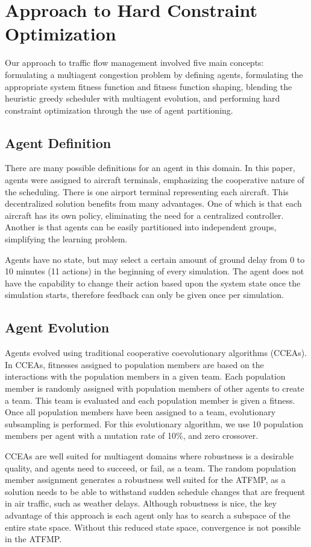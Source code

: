 \documentclass{sig-alternate}
\begin{document}
\section{Approach to Hard Constraint Optimization}

Our approach to traffic flow management involved five main concepts: formulating a multiagent congestion problem by defining agents, formulating the appropriate system fitness function and fitness function shaping, blending the heuristic greedy scheduler with multiagent evolution, and performing hard constraint optimization through the use of agent partitioning.

\subsection{Agent Definition}
There are many possible definitions for an agent in this domain. In this paper, agents were assigned to aircraft terminals, emphasizing the cooperative nature of the scheduling. There is one airport terminal representing each aircraft. This decentralized solution benefits from many advantages. One of which is that each aircraft has its own policy, eliminating the need for a centralized controller. Another is that agents can be easily partitioned into independent groups, simplifying the learning problem.  

Agents have no state, but may select a certain amount of ground delay from 0 to 10 minutes (11 actions) in the beginning of every simulation. The agent does not have the capability to change their action based upon the system state once the simulation starts, therefore feedback can only be given once per simulation.

\subsection{Agent Evolution}
Agents evolved using traditional cooperative coevolutionary algorithms (CCEAs). In CCEAs, fitnesses assigned to population members are based on the interactions with the population members in a given team. Each population member is randomly assigned with population members of other agents to create a team. This team is evaluated and each population member is given a fitness. Once all population members have been assigned to a team, evolutionary subsampling is performed. For this evolutionary algorithm, we use 10 population members per agent with a mutation rate of 10\%, and zero crossover. 

CCEAs are well suited for multiagent domains where robustness is a desirable quality, and agents need to succeed, or fail, as a team. The random population member assignment generates a robustness well suited for the ATFMP, as a solution needs to be able to withstand sudden schedule changes that are frequent in air traffic, such as weather delays. Although robustness is nice, the key advantage of this approach is each agent only has to search a subspace of the entire state space. Without this reduced state space, convergence is not possible in the ATFMP. 
\end{document}

